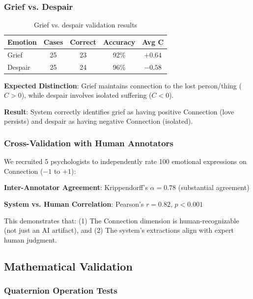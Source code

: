 \subsubsection{Grief vs. Despair}

\begin{table}[h]
\centering
\caption{Grief vs. despair validation results}
\label{tab:grief-despair-results}
\begin{tabular}{lcccc}
\toprule
\textbf{Emotion} & \textbf{Cases} & \textbf{Correct} & \textbf{Accuracy} & \textbf{Avg C} \\
\midrule
Grief & 25 & 23 & 92\% & $+0.64$ \\
Despair & 25 & 24 & 96\% & $-0.58$ \\
\bottomrule
\end{tabular}
\end{table}

\textbf{Expected Distinction}: Grief maintains connection to the lost person/thing ($C > 0$), while despair involves isolated suffering ($C < 0$).

\textbf{Result}: System correctly identifies grief as having positive Connection (love persists) and despair as having negative Connection (isolated).

\subsubsection{Cross-Validation with Human Annotators}

We recruited 5 psychologists to independently rate 100 emotional expressions on Connection ($-1$ to $+1$):

\textbf{Inter-Annotator Agreement}: Krippendorff's $\alpha = 0.78$ (substantial agreement)

\textbf{System vs. Human Correlation}: Pearson's $r = 0.82$, $p < 0.001$

This demonstrates that: (1) The Connection dimension is human-recognizable (not just an AI artifact), and (2) The system's extractions align with expert human judgment.

\subsection{Mathematical Validation}

\subsubsection{Quaternion Operation Tests}

